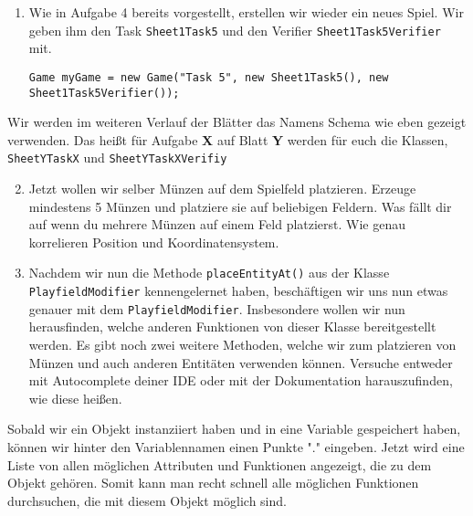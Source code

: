 

\begin{enumerate}
    \item Wie in Aufgabe 4 bereits vorgestellt, erstellen wir wieder ein neues Spiel. Wir geben ihm den Task \texttt{Sheet1Task5} und den Verifier \texttt{Sheet1Task5Verifier} mit.

    \begin{lstlisting}
Game myGame = new Game("Task 5", new Sheet1Task5(), new Sheet1Task5Verifier());
    \end{lstlisting}
\end{enumerate}

\begin{Infobox}
    Wir werden im weiteren Verlauf der Blätter das Namens Schema wie eben gezeigt verwenden. Das heißt für Aufgabe \textbf{X} auf Blatt \textbf{Y} werden für euch die Klassen, \texttt{SheetYTaskX} und \texttt{SheetYTaskXVerifiy}
\end{Infobox}

\begin{enumerate} \setcounter{enumi}{1}
    \item Jetzt wollen wir selber Münzen auf dem Spielfeld platzieren. Erzeuge mindestens 5 Münzen und platziere sie auf beliebigen Feldern. Was fällt dir auf wenn du mehrere Münzen auf einem Feld platzierst. Wie genau korrelieren Position und Koordinatensystem.

    \item Nachdem wir nun die Methode \texttt{placeEntityAt()} aus der Klasse \texttt{PlayfieldModifier} kennengelernet haben, beschäftigen wir uns nun etwas genauer mit dem \texttt{PlayfieldModifier}. Insbesondere wollen wir nun herausfinden, welche anderen Funktionen von dieser Klasse bereitgestellt werden. Es gibt noch zwei weitere Methoden, welche wir zum platzieren von Münzen und auch anderen Entitäten verwenden können. Versuche entweder mit Autocomplete deiner IDE oder mit der Dokumentation harauszufinden, wie diese heißen.
\end{enumerate}

\begin{Infobox}[Autocompletion]
    Sobald wir ein Objekt instanziiert haben und in eine Variable gespeichert haben, können wir hinter den Variablennamen einen Punkte "." eingeben. Jetzt wird eine Liste von allen möglichen Attributen und Funktionen angezeigt, die zu dem Objekt gehören. Somit kann man recht schnell alle möglichen Funktionen durchsuchen, die mit diesem Objekt möglich sind.
\end{Infobox}

